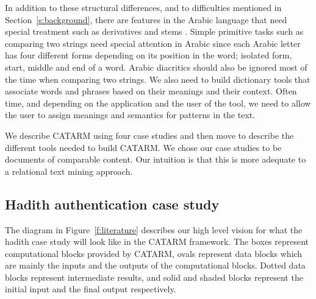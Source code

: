 \documentclass[12pt]{article}
\newcommand{\noTrNoVocRL}[1]{\novocalize\transfalse\RL{#1}\transtrue\vocalize}
\begin{document}
In addition to these structural differences,
and to difficulties mentioned in Section~\ref{s:background},
there are features in the Arabic language that need special 
treatment such as derivatives and stems 
\noTrNoVocRL{alm^staq-at w al^g_dwr}.
Simple primitive tasks such as comparing two strings need 
special attention in Arabic since each Arabic letter has 
four different forms depending on its position in the word; 
isolated form, start, middle and end of a word.
Arabic diacritics should also be ignored most of the time 
when comparing two strings.
We also need to build dictionary tools that associate words 
and phrases based on their meanings and their context.
Often time,
and depending on the application and the user of the tool,
we need to allow the user to assign meanings and semantics 
for patterns in the text.

We describe CATARM using four case studies and then move
to describe the different tools needed to build
CATARM.
We chose our case studies to be documents of comparable
content. 
Our intuition is that this is more 
adequate to a relational text mining approach.

\subsection{Hadith authentication case study}
\label{s:design:lit}

\begin{figure}
\end{figure}

The diagram in Figure~\ref{f:literature} describes our 
high level vision for what the hadith case study
will look like in the CATARM framework. 
The boxes represent 
computational blocks provided by CATARM, 
ovals represent data blocks which are mainly the 
inputs and the outputs of the computational blocks. 
Dotted data blocks represent intermediate results,
and solid and shaded blocks represent the initial input 
and the final output respectively. 
\end{document}
